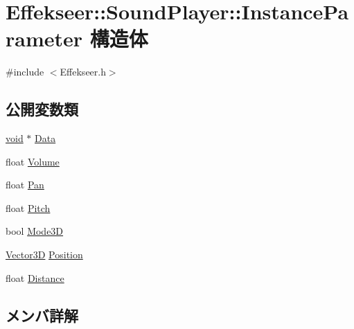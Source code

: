 \hypertarget{struct_effekseer_1_1_sound_player_1_1_instance_parameter}{}\section{Effekseer\+:\+:Sound\+Player\+:\+:Instance\+Parameter 構造体}
\label{struct_effekseer_1_1_sound_player_1_1_instance_parameter}


{\ttfamily \#include $<$Effekseer.\+h$>$}

\subsection*{公開変数類}
\begin{DoxyCompactItemize}
\item 
\mbox{\hyperlink{namespace_effekseer_ab34c4088e512200cf4c2716f168deb56}{void}} $\ast$ \mbox{\hyperlink{struct_effekseer_1_1_sound_player_1_1_instance_parameter_a882efc09266af458007f54298e288150}{Data}}
\item 
float \mbox{\hyperlink{struct_effekseer_1_1_sound_player_1_1_instance_parameter_ab128c51dd7ae26cc09c6a3ee716b9a14}{Volume}}
\item 
float \mbox{\hyperlink{struct_effekseer_1_1_sound_player_1_1_instance_parameter_ade1b072a2382d08ca7dbe7f8ea4a8c08}{Pan}}
\item 
float \mbox{\hyperlink{struct_effekseer_1_1_sound_player_1_1_instance_parameter_a642e90999b491b94def5164be452ee8f}{Pitch}}
\item 
bool \mbox{\hyperlink{struct_effekseer_1_1_sound_player_1_1_instance_parameter_ad80b9ddad2b07d89ecd865f1838cc84a}{Mode3D}}
\item 
\mbox{\hyperlink{struct_effekseer_1_1_vector3_d}{Vector3D}} \mbox{\hyperlink{struct_effekseer_1_1_sound_player_1_1_instance_parameter_a91587aeddc1536abfc346aa2e289fdd1}{Position}}
\item 
float \mbox{\hyperlink{struct_effekseer_1_1_sound_player_1_1_instance_parameter_a89783f7ffd762a9d44580fc302a753b8}{Distance}}
\end{DoxyCompactItemize}


\subsection{メンバ詳解}
\mbox{\label{struct_effekseer_1_1_sound_player_1_1_instance_parameter_a882efc09266af458007f54298e288150}} 
